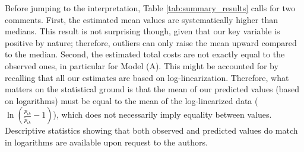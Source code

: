 \documentclass[a4paper,11pt]{article}
\begin{document}

Before jumping to the interpretation, Table \ref{tab:summary_results} calls for two comments. First, the estimated mean values are systematically higher than medians. This result is not surprising though, given that our key variable is positive by nature; therefore, outliers can only raise the mean upward compared to the median. Second, the estimated total costs are not exactly equal to the observed ones, in particular for Model (A). This might be accounted for by recalling that all our estimates are based on log-linearization. Therefore, what matters on the statistical ground is that the mean of our predicted values (based on logarithms) must be equal to the mean of the log-linearized data ($\ln\left(\frac{p_{ik}}{\widetilde{p}_{ik}}-1 \right)$), which does not necessarily imply equality between values. Descriptive statistics showing that both observed and predicted values do match in logarithms are available upon request to the authors.
\end{document}
